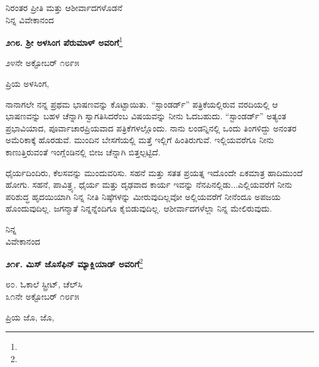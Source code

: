 \vspace{-0.3cm}

{\flushright
ನಿರಂತರ ಪ್ರೀತಿ ಮತ್ತು ಆಶೀರ್ವಾದಗಳೊಡನೆ\\ನಿನ್ನ ವಿವೇಕಾನಂದ\par}

\begin{center}
\textbf{೨೧೮. ಶ‍್ರೀ ಅಳಸಿಂಗ ಪೆರುಮಾಳ್ ಅವರಿಗೆ}\footnote{}
\end{center}

\vspace{-0.5cm}

\begin{flushright}
೨೪ನೇ ಅಕ್ಟೋಬರ್ ೧೮೯೫
\end{flushright}

\vspace{-0.3cm}

\noindent
ಪ್ರಿಯ ಅಳಸಿಂಗ,

ನಾನಾಗಲೇ ನನ್ನ ಪ್ರಥಮ ಭಾಷಣವನ್ನು ಕೊಟ್ಟಾಯಿತು. ``ಸ್ಟಾಂಡರ್ಡ್” ಪತ್ರಿಕೆಯಲ್ಲಿರುವ ವರದಿಯಲ್ಲಿ ಆ ಭಾಷಣವನ್ನು ಬಹಳ ಚೆನ್ನಾಗಿ ಸ್ವಾಗತಿಸಿದರೆಂಬ ವಿಷಯವನ್ನು ನೀನು ಓದಬಹುದು. “ಸ್ಟಾಂಡರ್ಡ್” ಅತ್ಯಂತ ಪ್ರಭಾವಿಯಾದ, ಪೂರ್ವಾಚಾರಪ್ರಿಯವಾದ ಪತ್ರಿಕೆಗಳಲ್ಲೊಂದು. ನಾನು ಲಂಡನ್ನಿನಲ್ಲಿ ಒಂದು ತಿಂಗಳಿದ್ದು ಅನಂತರ ಅಮೆರಿಕಾಕ್ಕೆ ಹೊರಡುವೆ. ಮುಂದಿನ ಬೇಸಗೆಯಲ್ಲಿ ಮತ್ತೆ ಇಲ್ಲಿಗೆ ಹಿಂತಿರುಗುವೆ. ಇಲ್ಲಿಯವರೆಗೂ ನೀನು ಕಾಣುತ್ತಿರುವಂತೆ ಇಂಗ್ಲೆಂಡಿನಲ್ಲಿ ಬೀಜ ಚೆನ್ನಾಗಿ ಬಿತ್ತಲ್ಪಟ್ಟಿದೆ.

\vspace{0.1cm}

ಧೈರ್ಯದಿಂದಿರು, ಕೆಲಸವನ್ನು ಮುಂದುವರಿಸು. ಸಹನೆ ಮತ್ತು ಸತತ ಪ್ರಯತ್ನ ಇದೊಂದೇ ಏಕಮಾತ್ರ ಹಾದಿ\enginline{-}ಮುಂದೆ ಹೋಗು. ಸಹನೆ, ಪಾವಿತ್ರ್ಯ, ಧೈರ್ಯ ಮತ್ತು ದೃಢವಾದ ಕಾರ್ಯ ಇವನ್ನು ನೆನಪಿನಲ್ಲಿಡು...ಎಲ್ಲಿಯವರೆಗೆ ನೀನು ಪರಿಶುದ್ಧ ಹೃದಯಿಯಾಗಿ ನಿನ್ನ ನೀತಿ ನಿಷ್ಠೆಗಳನ್ನು ಮೀರುವುದಿಲ್ಲವೋ ಅಲ್ಲಿಯವರೆಗೆ ನೀನೆಂದೂ ಅಪಜಯ ಹೊಂದುವುದಿಲ್ಲ. ಜಗನ್ಮಾತೆ ನಿನ್ನನ್ನೆಂದಿಗೂ ಕೈಬಿಡುವುದಿಲ್ಲ. ಆಶೀರ್ವಾದಗಳೆಲ್ಲಾ ನಿನ್ನ ಮೇಲಿರುವುದು.

{\flushright
ನಿನ್ನ\\ವಿವೇಕಾನಂದ\par}

\begin{center}
\textbf{೨೧೯. ಮಿಸ್‌ ಜೊಸೆಫಿನ್ ಮ್ಯಾಕ್ಲಿಯಾಡ್ ಅವರಿಗೆ}\footnote{}
\end{center}

\begin{flushright}
೮೦. ಓಕಾಲೆ ಸ್ಟ್ರೀಟ್, ಚೆಲ್‌ಸಿ\\೩೧ನೇ ಅಕ್ಟೋಬರ್ ೧೮೯೫
\end{flushright}

\noindent
ಪ್ರಿಯ ಜೊ, ಜೊ,

\vspace{0.1cm}

